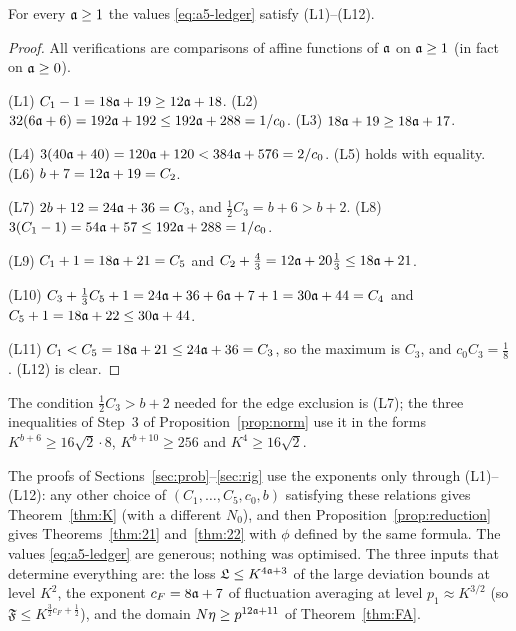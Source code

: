 \begin{lemma}\label{lem:ledger}
For every $\mathfrak{a}\ge1$ the values \eqref{eq:a5-ledger} satisfy \textup{(L1)--(L12)}.
\end{lemma}
\begin{proof}
All verifications are comparisons of affine functions of $\mathfrak{a}$ on $\mathfrak{a}\ge1$ (in fact on $\mathfrak{a}\ge0$).

(L1) $C_1-1=18\mathfrak{a}+19\ge12\mathfrak{a}+18$.\quad
(L2) $32(6\mathfrak{a}+6)=192\mathfrak{a}+192\le192\mathfrak{a}+288=1/c_0$.\quad
(L3) $18\mathfrak{a}+19\ge18\mathfrak{a}+17$.

(L4) $3(40\mathfrak{a}+40)=120\mathfrak{a}+120<384\mathfrak{a}+576=2/c_0$.\quad
(L5) holds with equality.\quad
(L6) $b+7=12\mathfrak{a}+19=C_2$.

(L7) $2b+12=24\mathfrak{a}+36=C_3$, and $\frac12C_3=b+6>b+2$.\quad
(L8) $3(C_1-1)=54\mathfrak{a}+57\le192\mathfrak{a}+288=1/c_0$.

(L9) $C_1+1=18\mathfrak{a}+21=C_5$ and $C_2+\frac43=12\mathfrak{a}+20\frac13\le18\mathfrak{a}+21$.

(L10) $C_3+\frac13C_5+1=24\mathfrak{a}+36+6\mathfrak{a}+7+1=30\mathfrak{a}+44=C_4$ and $C_5+1=18\mathfrak{a}+22\le30\mathfrak{a}+44$.

(L11) $C_1<C_5=18\mathfrak{a}+21\le24\mathfrak{a}+36=C_3$, so the maximum is $C_3$, and $c_0C_3=\frac18$.\quad
(L12) is clear.
\end{proof}
\noindent The condition $\frac12C_3>b+2$ needed for the edge exclusion is (L7); the three inequalities of Step~3 of Proposition~\ref{prop:norm} use it in the forms $K^{b+6}\ge16\sqrt2\cdot8$, $K^{b+10}\ge256$ and $K^{4}\ge16\sqrt2$.

\begin{remark}[Robustness]\label{rem:robust}
The proofs of Sections~\ref{sec:prob}--\ref{sec:rig} use the exponents only through (L1)--(L12): any other choice of $(C_1,\dots,C_5,c_0,b)$ satisfying these relations gives Theorem~\ref{thm:K} (with a different $N_0$), and then Proposition~\ref{prop:reduction} gives Theorems~\ref{thm:21} and~\ref{thm:22}
with $\phi$ defined by the same formula. The values \eqref{eq:a5-ledger} are generous; nothing was optimised. The three inputs that determine everything are: the loss $\mathfrak{L}\le K^{4\mathfrak{a}+3}$ of the large deviation bounds at level $K^2$, the exponent $c_F=8\mathfrak{a}+7$ of fluctuation averaging at level $p_1\approx K^{3/2}$
(so $\mathfrak F\le K^{\frac32c_F+\frac12}$), and the domain $N\eta\ge p^{12\mathfrak{a}+11}$ of Theorem~\ref{thm:FA}.
\end{remark}

